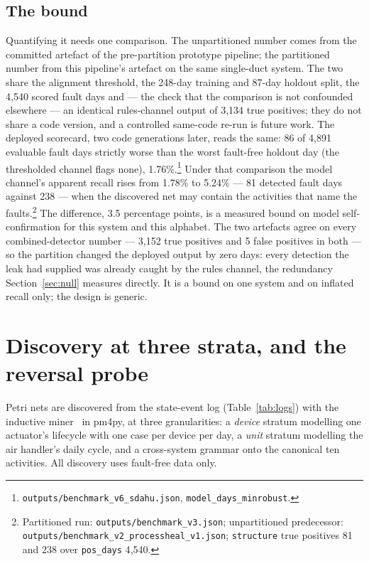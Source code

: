 \documentclass[runningheads]{llncs}
\begin{document}
\subsection{The bound}

Quantifying it needs one comparison. The unpartitioned number comes from the committed artefact of the pre-partition prototype pipeline; the partitioned number from this pipeline's artefact on the same single-duct system. The two share the alignment threshold, the 248-day training and 87-day holdout split, the 4{,}540 scored fault days and --- the check that the comparison is not confounded elsewhere --- an identical rules-channel output of 3{,}134 true positives; they do not share a code version, and a controlled same-code re-run is future work. The deployed scorecard, two code generations later, reads the same: 86 of 4{,}891 evaluable fault days strictly worse than the worst fault-free holdout day (the thresholded channel flags none), 1.76\%.\footnote{\texttt{outputs/benchmark\_v6\_sdahu.json}, \texttt{model\_days\_minrobust}.} Under that comparison the model channel's apparent recall rises from 1.78\% to 5.24\% --- 81 detected fault days against 238 --- when the discovered net may contain the activities that name the faults.\footnote{Partitioned run: \texttt{outputs/benchmark\_v3.json}; unpartitioned predecessor: \texttt{outputs/benchmark\_v2\_processheal\_v1.json}; \texttt{structure} true positives 81 and 238 over \texttt{pos\_days} 4{,}540.} The difference, 3.5 percentage points, is a measured bound on model self-confirmation for this system and this alphabet. The two artefacts agree on every combined-detector number --- 3{,}152 true positives and 5 false positives in both --- so the partition changed the deployed output by zero days: every detection the leak had supplied was already caught by the rules channel, the redundancy Section~\ref{sec:null} measures directly. It is a bound on one system and on inflated recall only; the design is generic.

\section{Discovery at three strata, and the reversal probe}
\label{sec:discovery}

Petri nets are discovered from the state-event log (Table~\ref{tab:logs}) with the inductive miner~\cite{leemans2013inductiveminer} in pm4py, at three granularities: a \emph{device} stratum modelling one actuator's lifecycle with one case per device per day, a \emph{unit} stratum modelling the air handler's daily cycle, and a cross-system grammar onto the canonical ten activities. All discovery uses fault-free data only.
\end{document}

